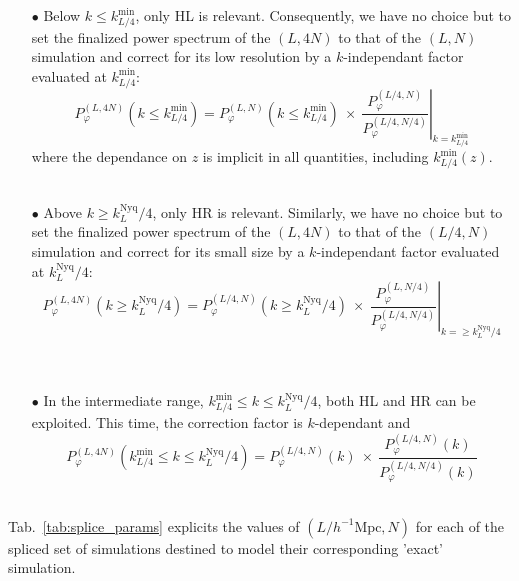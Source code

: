 \begin{itemize}
\item[$\bullet$] Below $k \leqslant k_{L/4}^{\mathrm{min}}$, only HL is relevant. Consequently, we have no choice but to set the finalized power spectrum of the $(L, 4N)$ to that of the $(L, N)$ simulation and correct for its low resolution by a $k$-independant factor evaluated at $k_{L/4}^{\mathrm{min}}$:
	\begin{equation}
	\label{eq:low_regime}
	P_{\varphi}^{(L, 4N)} (k \leqslant k_{L/4}^{\mathrm{min}}) = P_{\varphi}^{(L, N)} (k \leqslant k_{L/4}^{\mathrm{min}}) ~\times~ \left. \frac{P_{\varphi}^{(L/4, N)}}{P_{\varphi}^{(L/4, N/4)}} \right\vert_{k=k_{L/4}^{\mathrm{min}}}
	\end{equation}
where the dependance on $z$ is implicit in all quantities, including $k_{L/4}^{\mathrm{min}}(z)$. \\
\\
\item[$\bullet$] Above $k \geqslant k_{L}^{\mathrm{Nyq}}/4$, only HR is relevant. Similarly, we have no choice but to set the finalized power spectrum of the $(L, 4N)$ to that of the $(L/4, N)$ simulation and correct for its small size by a $k$-independant factor evaluated at $k_{L}^{\mathrm{Nyq}}/4$:
	\begin{equation}
	\label{eq:intermediate_regime}
	P_{\varphi}^{(L, 4N)} (k \geqslant k_{L}^{\mathrm{Nyq}}/4) = P_{\varphi}^{(L/4, N)} (k \geqslant k_{L}^{\mathrm{Nyq}}/4) ~\times~ \left. \frac{P_{\varphi}^{(L, N/4)}}{P_{\varphi}^{(L/4, N/4)}} \right\vert_{k=\geqslant k_{L}^{\mathrm{Nyq}}/4}
	\end{equation} \\
\\
\item[$\bullet$] In the intermediate range, $k_{L/4}^{\mathrm{min}} \leqslant k \leqslant k_{L}^{\mathrm{Nyq}}/4$, both HL and HR can be exploited. This time, the correction factor is $k$-dependant and
	\begin{equation}
	P_{\varphi}^{(L, 4N)} (k_{L/4}^{\mathrm{min}} \leqslant k \leqslant k_{L}^{\mathrm{Nyq}}/4) = P_{\varphi}^{(L/4, N)} (k) ~\times~  \frac{P_{\varphi}^{(L/4, N)}(k)}{P_{\varphi}^{(L/4, N/4)}(k)}
	\end{equation} \\
\end{itemize}

Tab.~\ref{tab:splice_params} explicits the values of $(L/h^{-1}\mathrm{Mpc}, N)$ for each of the spliced set of simulations destined to model their corresponding 'exact' simulation.


